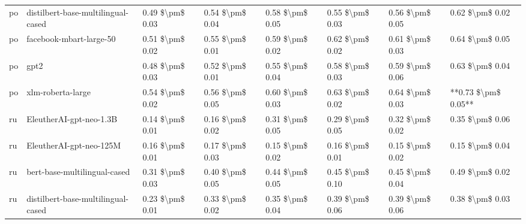 \begin{tabular}{llllllll}
      po & distilbert-base-multilingual-cased & 0.49 \$\textbackslash pm\$ 0.03 &           0.54 \$\textbackslash pm\$ 0.04 &       0.58 \$\textbackslash pm\$ 0.05 &        0.55 \$\textbackslash pm\$ 0.03 &                         0.56 \$\textbackslash pm\$ 0.05 &     0.62 \$\textbackslash pm\$ 0.02 \\
      po &            facebook-mbart-large-50 & 0.51 \$\textbackslash pm\$ 0.02 &           0.55 \$\textbackslash pm\$ 0.01 &       0.59 \$\textbackslash pm\$ 0.02 &        0.62 \$\textbackslash pm\$ 0.02 &                         0.61 \$\textbackslash pm\$ 0.03 &     0.64 \$\textbackslash pm\$ 0.05 \\
      po &                               gpt2 & 0.48 \$\textbackslash pm\$ 0.03 &           0.52 \$\textbackslash pm\$ 0.01 &       0.55 \$\textbackslash pm\$ 0.04 &        0.58 \$\textbackslash pm\$ 0.03 &                         0.59 \$\textbackslash pm\$ 0.06 &     0.63 \$\textbackslash pm\$ 0.04 \\
      po &                  xlm-roberta-large & 0.54 \$\textbackslash pm\$ 0.02 &           0.56 \$\textbackslash pm\$ 0.05 &       0.60 \$\textbackslash pm\$ 0.03 &        0.63 \$\textbackslash pm\$ 0.02 &                         0.64 \$\textbackslash pm\$ 0.03 & **0.73 \$\textbackslash pm\$ 0.05** \\
      ru &            EleutherAI-gpt-neo-1.3B & 0.14 \$\textbackslash pm\$ 0.01 &           0.16 \$\textbackslash pm\$ 0.02 &       0.31 \$\textbackslash pm\$ 0.05 &        0.29 \$\textbackslash pm\$ 0.05 &                         0.32 \$\textbackslash pm\$ 0.02 &     0.35 \$\textbackslash pm\$ 0.06 \\
      ru &            EleutherAI-gpt-neo-125M & 0.16 \$\textbackslash pm\$ 0.01 &           0.17 \$\textbackslash pm\$ 0.03 &       0.15 \$\textbackslash pm\$ 0.02 &        0.16 \$\textbackslash pm\$ 0.01 &                         0.15 \$\textbackslash pm\$ 0.02 &     0.15 \$\textbackslash pm\$ 0.04 \\
      ru &       bert-base-multilingual-cased & 0.31 \$\textbackslash pm\$ 0.03 &           0.40 \$\textbackslash pm\$ 0.05 &       0.44 \$\textbackslash pm\$ 0.05 &        0.45 \$\textbackslash pm\$ 0.10 &                         0.45 \$\textbackslash pm\$ 0.04 &     0.49 \$\textbackslash pm\$ 0.02 \\
      ru & distilbert-base-multilingual-cased & 0.23 \$\textbackslash pm\$ 0.01 &           0.33 \$\textbackslash pm\$ 0.02 &       0.35 \$\textbackslash pm\$ 0.04 &        0.39 \$\textbackslash pm\$ 0.06 &                         0.39 \$\textbackslash pm\$ 0.06 &     0.38 \$\textbackslash pm\$ 0.03 \\

\end{tabular}
